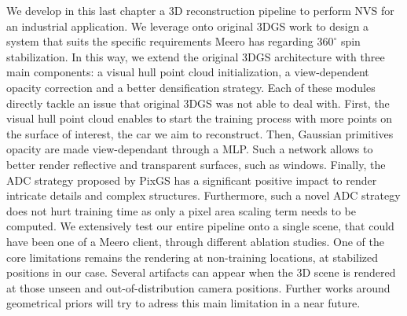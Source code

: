 We develop in this last chapter a 3D reconstruction pipeline to perform \ac{NVS} for an industrial application. We leverage onto original 3D\ac{GS} \citep{kerbl20233d} work to design a system that suits the specific requirements Meero has regarding $360^{\circ}$ spin stabilization. In this way, we extend the original 3D\ac{GS} architecture with three main components: a visual hull point cloud initialization, a view-dependent opacity correction and a better densification strategy. Each of these modules directly tackle an issue that original 3D\ac{GS} was not able to deal with. First, the visual hull point cloud enables to start the training process with more points on the surface of interest, \ie the car we aim to reconstruct. Then, Gaussian primitives opacity are made view-dependant through a \ac{MLP}. Such a network allows to better render reflective and transparent surfaces, such as windows. Finally, the \ac{ADC} strategy proposed by PixGS \citep{zhang2024pixel} has a significant positive impact to render intricate details and complex structures. Furthermore, such a novel \ac{ADC} strategy does not hurt training time as only a pixel area scaling term needs to be computed. We extensively test our entire pipeline onto a single scene, that could have been one of a Meero client, through different ablation studies. One of the core limitations remains the rendering at non-training locations, \ie at stabilized positions in our case. Several artifacts can appear when the 3D scene is rendered at those unseen and out-of-distribution camera positions. Further works around geometrical priors will try to adress this main limitation in a near future. 
